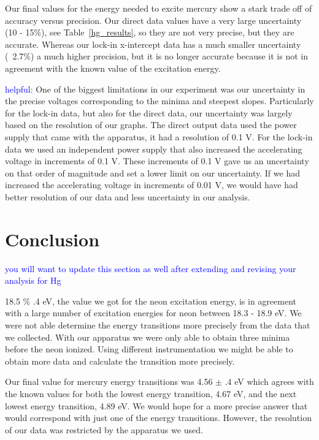 \documentclass[prb,preprint]{revtex4-1}
\begin{document}
Our final values for the energy needed to excite mercury show a stark trade off of accuracy versus precision. Our direct data values have a very large uncertainty (10 - 15$\%$), see Table~\ref{hg_results}, so they are not very precise, but they are accurate. Whereas our lock-in x-intercept data has a much smaller uncertainty (~2.7$\%$) a much higher precision, but it is no longer accurate because it is not in agreement with the known value of the excitation energy.

\textcolor{blue}{helpful:} One of the biggest limitations in our experiment was our uncertainty in the precise voltages corresponding to the minima and steepest slopes. Particularly for the lock-in data, but also for the direct data, our uncertainty was largely based on the resolution of our graphs. The direct output data used the power supply that came with the apparatus, it had a resolution of 0.1 V. For the lock-in data we used an independent power supply that also increased the accelerating voltage in increments of 0.1 V. These increments of 0.1 V gave us an uncertainty on that order of magnitude and set a lower limit on our uncertainty. If we had increased the accelerating voltage in increments of 0.01 V, we would have had better resolution of our data and less uncertainty in our analysis. 

\section{Conclusion}

\textcolor{blue}{you will want to update this section as well after extending and revising your analysis for Hg}

18.5 $\%$ .4 eV, the value we got for the neon excitation energy, is in agreement with a large number of excitation energies for neon between 18.3 - 18.9 eV. We were not able determine the energy transitions more precisely from the data that we collected. With our apparatus we were only able to obtain three minima before the neon ionized. Using different instrumentation we might be able to obtain more data and calculate the transition more precisely.

Our final value for mercury energy transitions was 4.56 $\pm$ .4 eV which agrees with the known values for both the lowest energy transition, 4.67 eV, and the next lowest energy transition, 4.89 eV. We would hope for a more precise answer that would correspond with just one of the energy transitions. However, the resolution of our data was restricted by the apparatus we used.
\end{document}
